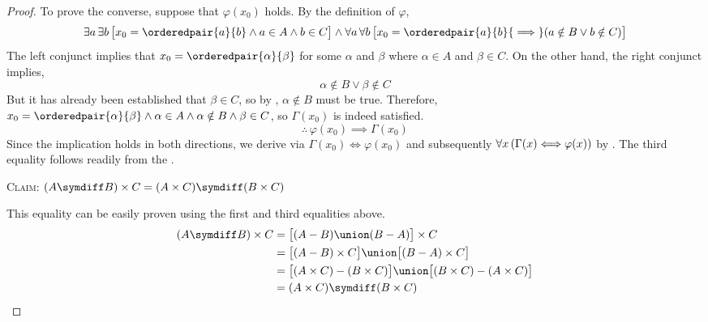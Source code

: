 \begin{proof}
    \vspace{0.2cm}
    \noindent
    To prove the converse, suppose that \( \varphi(x_{0}) \) holds. By the definition of \( \varphi \),
    \begin{equation*}
        \exists a \, \exists b \, \big[ x_{0} = \orderedpair{a}{b} \land a \in A \land b \in C \big]
        \land
        \forall a \, \forall b \, \big[ x_{0} = \orderedpair{a}{b} {\implies} \mleft( a \notin B \lor b \notin C \mright) \big]
    \end{equation*}
    The left conjunct implies that \( x_{0} = \orderedpair{\alpha}{\beta}\) for some \( \alpha \) and \( \beta \)
    where \( \alpha \in A \) and \( \beta \in C \). On the other hand, the right conjunct implies,
    \begin{equation*}
        \alpha \notin B \lor \beta \notin C
    \end{equation*}
    But it has already been established that \( \beta \in C \), so by , \( \alpha \notin B \) must be
    true. Therefore, \( x_{0} = \orderedpair{\alpha}{\beta} \land \alpha \in A \land \alpha \notin B \land \beta \in C \),
    so \( \Gamma(x_{0}) \) is indeed satisfied.
    \begin{equation*}
        \therefore \, \varphi(x_{0}) \implies \Gamma(x_{0})
    \end{equation*}
    Since the implication holds in both directions, we derive via 
    \( \Gamma(x_{0}) {\iff} \varphi(x_{0}) \) and subsequently
    \( \forall x \, \mleft( \Gamma(x) {\iff} \varphi(x) \mright) \) by .
    The third equality follows readily from the .

    \vspace{0.5cm}
    \noindent
    {\scshape Claim}: \( \mleft( A \symdiff B \mright) \times C = \mleft( A \times C \mright) \symdiff \mleft( B \times C \mright) \)

    \vspace{0.1cm}
    \noindent
    This equality can be easily proven using the first and third equalities above.
    \begin{align*}
        \mleft( A \symdiff B \mright) \times C
        &=
        \big[ \mleft( A - B \mright) \union \mleft( B - A \mright) \big] \times C \\
        &=
        \big[  \mleft( A - B \mright) \times C \big] \union \big[ \mleft( B - A \mright) \times C \big] \\
        &=
        \big[ \mleft( A \times C \mright) - \mleft( B \times C \mright) \big]
        \union
        \big[ \mleft( B \times C \mright) - \mleft( A \times C \mright) \big] \\
        &=
        \mleft( A \times C \mright) \symdiff \mleft( B \times C \mright) \qedhere
    \end{align*}
\end{proof}


